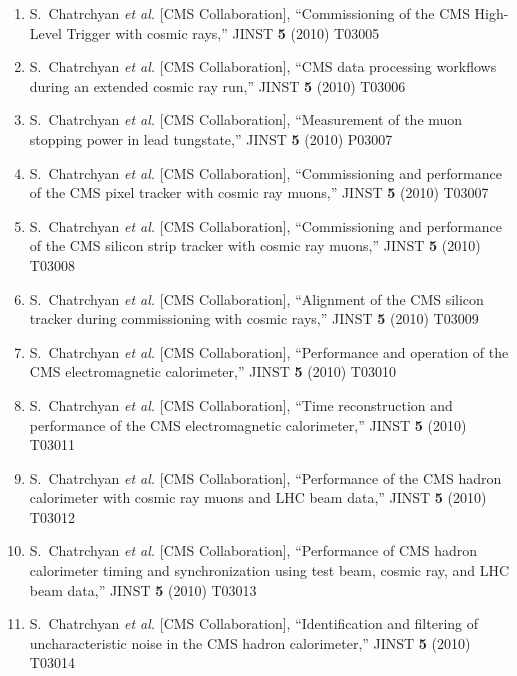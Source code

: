 \documentclass[10pt]{letter}
\begin{document}
\begin{enumerate}
\item S.~Chatrchyan {\it et al.}  [CMS Collaboration],
  ``Commissioning of the CMS High-Level Trigger with cosmic rays,''
  JINST {\bf 5} (2010) T03005

\item S.~Chatrchyan {\it et al.}  [CMS Collaboration],
  ``CMS data processing workflows during an extended cosmic ray run,''
  JINST {\bf 5} (2010) T03006

\item S.~Chatrchyan {\it et al.}  [CMS Collaboration],
  ``Measurement of the muon stopping power in lead tungstate,''
  JINST {\bf 5} (2010) P03007

\item S.~Chatrchyan {\it et al.}  [CMS Collaboration],
  ``Commissioning and performance of the CMS pixel tracker with cosmic ray muons,''
  JINST {\bf 5} (2010) T03007

\item S.~Chatrchyan {\it et al.}  [CMS Collaboration],
  ``Commissioning and performance of the CMS silicon strip tracker with cosmic ray muons,''
  JINST {\bf 5} (2010) T03008

\item S.~Chatrchyan {\it et al.}  [CMS Collaboration],
  ``Alignment of the CMS silicon tracker during commissioning with cosmic rays,''
  JINST {\bf 5} (2010) T03009

\item S.~Chatrchyan {\it et al.}  [CMS Collaboration],
  ``Performance and operation of the CMS electromagnetic calorimeter,''
  JINST {\bf 5} (2010) T03010

\item S.~Chatrchyan {\it et al.}  [CMS Collaboration],
  ``Time reconstruction and performance of the CMS electromagnetic calorimeter,''
  JINST {\bf 5} (2010) T03011

\item S.~Chatrchyan {\it et al.}  [CMS Collaboration],
  ``Performance of the CMS hadron calorimeter with cosmic ray muons and LHC beam data,''
  JINST {\bf 5} (2010) T03012

\item S.~Chatrchyan {\it et al.}  [CMS Collaboration],
  ``Performance of CMS hadron calorimeter timing and synchronization using test beam, cosmic ray, and LHC beam data,''
  JINST {\bf 5} (2010) T03013

\item S.~Chatrchyan {\it et al.}  [CMS Collaboration],
  ``Identification and filtering of uncharacteristic noise in the CMS hadron calorimeter,''
  JINST {\bf 5} (2010) T03014


\end{enumerate}
\end{document}
